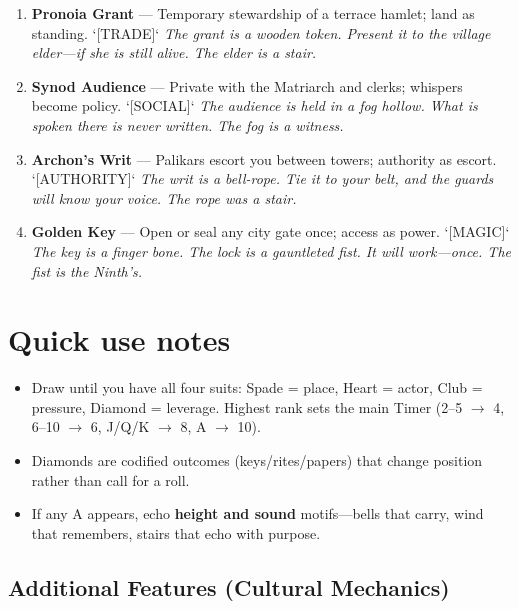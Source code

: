 \begin{enumerate}
\item[J] \textbf{Pronoia Grant} --- Temporary stewardship of a terrace hamlet; land as standing. `[TRADE]`
  \hfill \textit{The grant is a wooden token. Present it to the village elder---if she is still alive. The elder is a stair.}
\item[Q] \textbf{Synod Audience} --- Private with the Matriarch and clerks; whispers become policy. `[SOCIAL]`
  \hfill \textit{The audience is held in a fog hollow. What is spoken there is never written. The fog is a witness.}
\item[K] \textbf{Archon's Writ} --- Palikars escort you between towers; authority as escort. `[AUTHORITY]`
  \hfill \textit{The writ is a bell-rope. Tie it to your belt, and the guards will know your voice. The rope was a stair.}
\item[A] \textbf{Golden Key} --- Open or seal any city gate once; access as power. `[MAGIC]`
  \hfill \textit{The key is a finger bone. The lock is a gauntleted fist. It will work---once. The fist is the Ninth's.}
\end{enumerate}

\section*{Quick use notes}
\label{sec:thepyrgos-quick-use}
\begin{itemize}
\item Draw until you have all four suits: Spade = place, Heart = actor, Club = pressure, Diamond = leverage. Highest rank sets the main Timer (2--5 $\rightarrow$ 4, 6--10 $\rightarrow$ 6, J/Q/K $\rightarrow$ 8, A $\rightarrow$ 10).
\item Diamonds are codified outcomes (keys/rites/papers) that change position rather than call for a roll.
\item If any A appears, echo \textbf{height and sound} motifs---bells that carry, wind that remembers, stairs that echo with purpose.
\end{itemize}

\subsection*{Additional Features (Cultural Mechanics)}
\label{sec:thepyrgos-mechanics}

